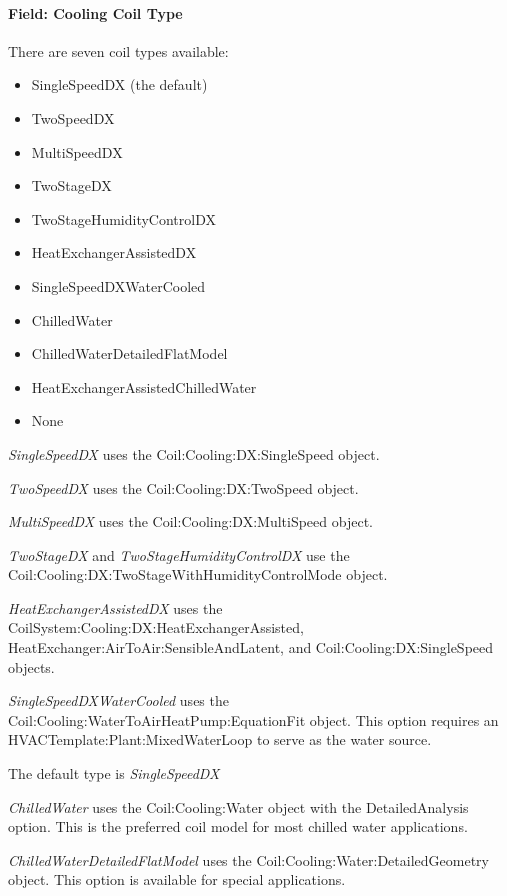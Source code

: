 \paragraph{Field: Cooling Coil Type}\label{field-cooling-coil-type-7}

There are seven coil types available:

\begin{itemize}
\item
  SingleSpeedDX (the default)
\item
  TwoSpeedDX
\item
  MultiSpeedDX
\item
  TwoStageDX
\item
  TwoStageHumidityControlDX
\item
  HeatExchangerAssistedDX
\item
  SingleSpeedDXWaterCooled
\item
  ChilledWater
\item
  ChilledWaterDetailedFlatModel
\item
  HeatExchangerAssistedChilledWater
\item
  None
\end{itemize}

\emph{SingleSpeedDX} uses the Coil:Cooling:DX:SingleSpeed object.

\emph{TwoSpeedDX} uses the Coil:Cooling:DX:TwoSpeed object.

\emph{MultiSpeedDX} uses the Coil:Cooling:DX:MultiSpeed object.

\emph{TwoStageDX} and \emph{TwoStageHumidityControlDX} use the Coil:Cooling:DX:TwoStageWithHumidityControlMode object.

\emph{HeatExchangerAssistedDX} uses the CoilSystem:Cooling:DX:HeatExchangerAssisted, HeatExchanger:AirToAir:SensibleAndLatent, and Coil:Cooling:DX:SingleSpeed objects.

\emph{SingleSpeedDXWaterCooled} uses the Coil:Cooling:WaterToAirHeatPump:EquationFit object. This option requires an HVACTemplate:Plant:MixedWaterLoop to serve as the water source.

The default type is \emph{SingleSpeedDX}

\emph{ChilledWater} uses the Coil:Cooling:Water object with the DetailedAnalysis option. This is the preferred coil model for most chilled water applications.

\emph{ChilledWaterDetailedFlatModel} uses the Coil:Cooling:Water:DetailedGeometry object. This option is available for special applications.

